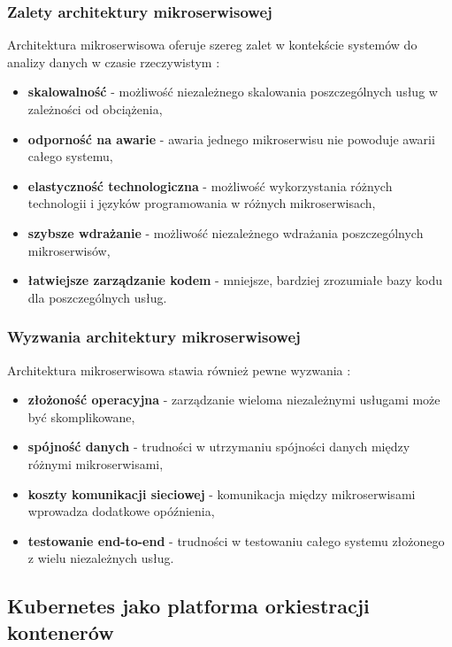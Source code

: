 \subsubsection{Zalety architektury mikroserwisowej}
\label{subsubsec:zalety_mikroserwisow}

Architektura mikroserwisowa oferuje szereg zalet w kontekście systemów do analizy danych w czasie rzeczywistym \citep{microservice_benefits}:

\begin{itemize}
    \item \textbf{skalowalność} - możliwość niezależnego skalowania poszczególnych usług w zależności od obciążenia,
    \item \textbf{odporność na awarie} - awaria jednego mikroserwisu nie powoduje awarii całego systemu,
    \item \textbf{elastyczność technologiczna} - możliwość wykorzystania różnych technologii i języków programowania w różnych mikroserwisach,
    \item \textbf{szybsze wdrażanie} - możliwość niezależnego wdrażania poszczególnych mikroserwisów,
    \item \textbf{łatwiejsze zarządzanie kodem} - mniejsze, bardziej zrozumiałe bazy kodu dla poszczególnych usług.
\end{itemize}

\subsubsection{Wyzwania architektury mikroserwisowej}
\label{subsubsec:wyzwania_mikroserwisow}

Architektura mikroserwisowa stawia również pewne wyzwania \citep{microservice_challenges}:

\begin{itemize}
    \item \textbf{złożoność operacyjna} - zarządzanie wieloma niezależnymi usługami może być skomplikowane,
    \item \textbf{spójność danych} - trudności w utrzymaniu spójności danych między różnymi mikroserwisami,
    \item \textbf{koszty komunikacji sieciowej} - komunikacja między mikroserwisami wprowadza dodatkowe opóźnienia,
    \item \textbf{testowanie end-to-end} - trudności w testowaniu całego systemu złożonego z wielu niezależnych usług.
\end{itemize}

\subsection{Kubernetes jako platforma orkiestracji kontenerów}
\label{subsec:kubernetes}

